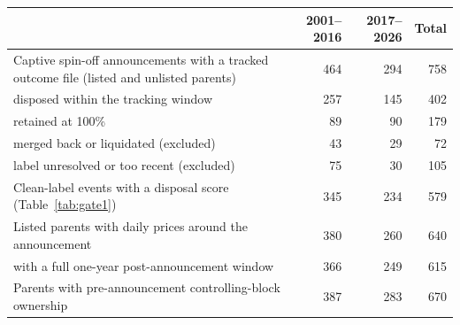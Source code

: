 \begin{tabular}{>{\raggedright\arraybackslash}p{9.2cm}rrr}
\toprule
 & 2001--2016 & 2017--2026 & Total \\
\midrule
Captive spin-off announcements with a tracked outcome file (listed and unlisted parents) & 464 & 294 & 758 \\
\quad disposed within the tracking window & 257 & 145 & 402 \\
\quad retained at 100\% & 89 & 90 & 179 \\
\quad merged back or liquidated (excluded) & 43 & 29 & 72 \\
\quad label unresolved or too recent (excluded) & 75 & 30 & 105 \\
Clean-label events with a disposal score (Table~\ref{tab:gate1}) & 345 & 234 & 579 \\
Listed parents with daily prices around the announcement & 380 & 260 & 640 \\
\quad with a full one-year post-announcement window & 366 & 249 & 615 \\
Parents with pre-announcement controlling-block ownership & 387 & 283 & 670 \\
\bottomrule
\end{tabular}
